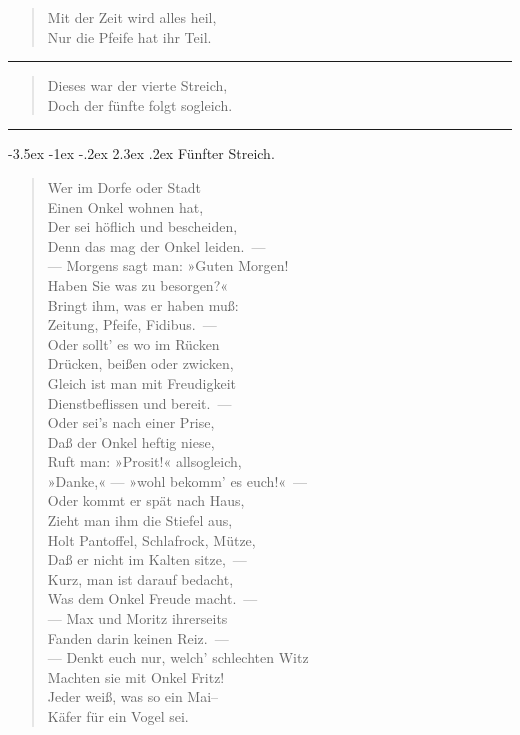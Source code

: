 \documentclass[a4paper,12pt]{article}
\makeatletter
\renewcommand\section{\@startsection {section}{1}{\z@}%
                                   {-3.5ex \@plus -1ex \@minus -.2ex}%
                                   {2.3ex \@plus.2ex}%
                                   {\centering\normalfont\LARGE\bfseries}}
\makeatother
\begin{document}
\begin{verse}
Mit der Zeit wird alles heil,\\{}
Nur die Pfeife hat ihr Teil.
\end{verse}


\hrule


\begin{verse}
Dieses war der vierte Streich,\\{}
Doch der fünfte folgt sogleich.
\end{verse}


\hrule


\clearpage
\section{Fünfter Streich.\label{Funfter_Streich}}


\begin{verse}
Wer im Dorfe oder Stadt\\{}
Einen Onkel wohnen hat,\\{}
Der sei höflich und bescheiden,\\{}
Denn das mag der Onkel leiden.~—\\{}
— Morgens sagt man: »Guten Morgen!\\{}
Haben Sie was zu besorgen?«\\{}
Bringt ihm, was er haben muß:\\{}
Zeitung, Pfeife, Fidibus.~—\\{}
Oder sollt' es wo im Rücken\\{}
Drücken, beißen oder zwicken,\\{}
Gleich ist man mit Freudigkeit\\{}
Dienstbeflissen und bereit.~—\\{}
Oder sei's nach einer Prise,\\{}
Daß der Onkel heftig niese,\\{}
Ruft man: »Prosit!« allsogleich,\\{}
»Danke,« — »wohl bekomm' es euch!«~—\\{}
Oder kommt er spät nach Haus,\\{}
Zieht man ihm die Stiefel aus,\\{}
Holt Pantoffel, Schlafrock, Mütze,\\{}
Daß er nicht im Kalten sitze,~—\\{}
Kurz, man ist darauf bedacht,\\{}
Was dem Onkel Freude macht.~—\\{}
— Max und Moritz ihrerseits\\{}
Fanden darin keinen Reiz.~—\\{}
— Denkt euch nur, welch' schlechten Witz\\{}
Machten sie mit Onkel Fritz!\\{}
Jeder weiß, was so ein Mai–\\{}
Käfer für ein Vogel sei.
\end{verse}
\end{document}
